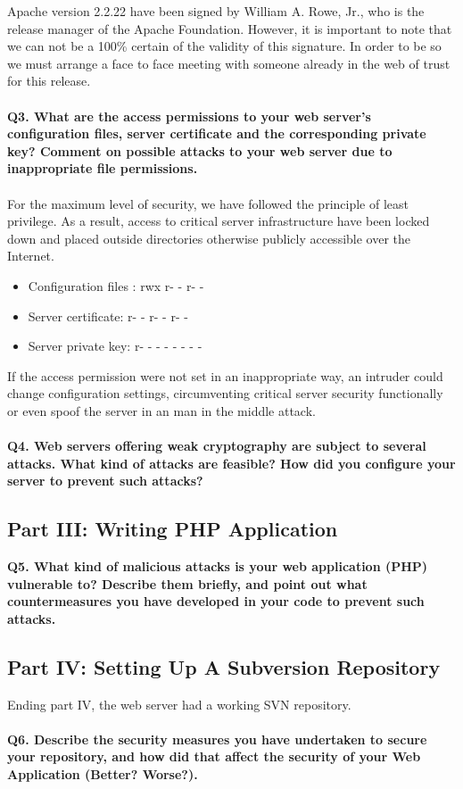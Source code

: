 \documentclass[a4paper, 12pt]{article}
\begin{document}
Apache version 2.2.22 have been signed by William A. Rowe, Jr., who is the release manager of the Apache Foundation. However, it is important to note that we can not be a 100\% certain of the validity of this signature. In order to be so we must arrange a face to face meeting \cite{fem} with someone already in the web of trust for this release. 
\\ \\
{\bf Q3. What are the access permissions to your web server’s configuration files, server certificate
and the corresponding private key? Comment on possible attacks to your web server due to
inappropriate file permissions.} \\
\\
For the maximum level of security, we have followed the principle of least privilege. As a result, access to critical server infrastructure have been locked down and placed outside directories otherwise publicly accessible over the Internet. 
\begin{itemize}
\item Configuration files : rwx r- - r- -
\item Server certificate: r- - r- - r- -
\item Server private key: r- -  - - -  - - - 
\end{itemize}
If the access permission were not set in an inappropriate way, an intruder could change configuration settings, circumventing critical server security functionally or even spoof the server in an man in the middle attack.
\\ \\
{\bf Q4. Web servers offering weak cryptography are subject to several attacks. What kind of
attacks are feasible? How did you configure your server to prevent such attacks?}

\subsection{Part III: Writing PHP Application}
{\bf Q5. What kind of malicious attacks is your web application (PHP) vulnerable to? Describe
them briefly, and point out what countermeasures you have developed in your code to prevent
such attacks.}

\subsection{Part IV: Setting Up A Subversion Repository}
Ending part IV, the web server had a working SVN repository. \\ \\
{\bf Q6. Describe the security measures you have undertaken to secure your repository, and
how did that affect the security of your Web Application (Better? Worse?).}
\end{document}
